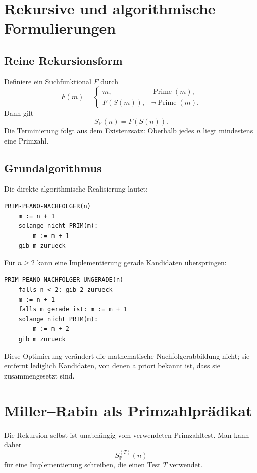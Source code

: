 \documentclass[11pt]{article}
\theoremstyle{definition}
\newcommand{\Pp}{\mathbb{P}}
\newcommand{\SP}{S_{\!\Pp}}
\newcommand{\Prime}{\operatorname{Prime}}
\begin{document}
\section{Rekursive und algorithmische Formulierungen}

\subsection{Reine Rekursionsform}

Definiere ein Suchfunktional $F$ durch
\[
F(m)=
\begin{cases}
m,&\Prime(m),\\
F(S(m)),&\neg\Prime(m).
\end{cases}
\]
Dann gilt
\[
\boxed{\SP(n)=F(S(n)).}
\]
Die Terminierung folgt aus dem Existenzsatz: Oberhalb jedes $n$ liegt mindestens eine Primzahl.

\subsection{Grundalgorithmus}

Die direkte algorithmische Realisierung lautet:

\begin{lstlisting}[language={},basicstyle=\ttfamily\small,frame=single]
PRIM-PEANO-NACHFOLGER(n)
    m := n + 1
    solange nicht PRIM(m):
        m := m + 1
    gib m zurueck
\end{lstlisting}

Für $n\ge2$ kann eine Implementierung gerade Kandidaten überspringen:

\begin{lstlisting}[language={},basicstyle=\ttfamily\small,frame=single]
PRIM-PEANO-NACHFOLGER-UNGERADE(n)
    falls n < 2: gib 2 zurueck
    m := n + 1
    falls m gerade ist: m := m + 1
    solange nicht PRIM(m):
        m := m + 2
    gib m zurueck
\end{lstlisting}

Diese Optimierung verändert die mathematische Nachfolgerabbildung nicht; sie entfernt lediglich Kandidaten, von denen a priori bekannt ist, dass sie zusammengesetzt sind.

\section{Miller--Rabin als Primzahlprädikat}

Die Rekursion selbst ist unabhängig vom verwendeten Primzahltest. Man kann daher
\[
\SP^{(T)}(n)
\]
für eine Implementierung schreiben, die einen Test $T$ verwendet.
\end{document}
